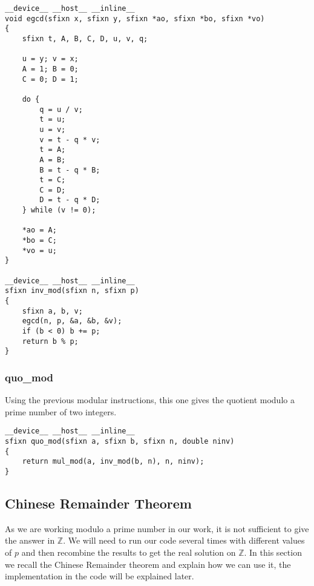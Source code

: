 \begin{verbatim}
__device__ __host__ __inline__ 
void egcd(sfixn x, sfixn y, sfixn *ao, sfixn *bo, sfixn *vo)
{
    sfixn t, A, B, C, D, u, v, q;

    u = y; v = x;
    A = 1; B = 0;
    C = 0; D = 1;

    do {
        q = u / v;
        t = u;
        u = v;
        v = t - q * v;
        t = A;
        A = B;
        B = t - q * B;
        t = C;
        C = D;
        D = t - q * D;
    } while (v != 0);

    *ao = A;
    *bo = C;
    *vo = u;
}

__device__ __host__ __inline__ 
sfixn inv_mod(sfixn n, sfixn p)
{
    sfixn a, b, v;
    egcd(n, p, &a, &b, &v);
    if (b < 0) b += p;
    return b % p;
}
\end{verbatim}

\subsubsection*{quo\_mod}
Using the previous modular instructions, this one gives the quotient modulo a prime number of two integers.\\

\begin{verbatim}
__device__ __host__ __inline__ 
sfixn quo_mod(sfixn a, sfixn b, sfixn n, double ninv)
{
    return mul_mod(a, inv_mod(b, n), n, ninv);
}
\end{verbatim}


\subsection{Chinese Remainder Theorem}
As we are working modulo a prime number in our work, it is not sufficient to give the answer in $\mathbb{Z}$. We will need to run our code several times with different values of $p$ and then recombine the results to get the real solution on $\mathbb{Z}$. In this section we recall the Chinese Remainder theorem and explain how we can use it, the implementation in the code will be explained later.\\

